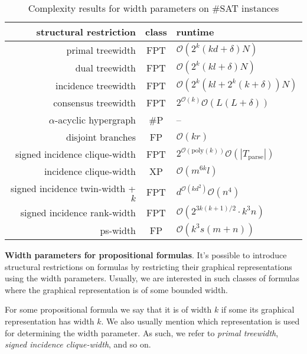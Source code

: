 \begin{table}
	\centering
	\begin{tabular}{r | c | l}
		\textbf{structural restriction} & \textbf{class} & \textbf{runtime} \\
		\hline
		primal treewidth \cite{DBLP:journals/jda/SamerS10} & FPT  & $\mathcal{O}(2^k(kd+\delta)N)$ \\
		dual treewidth \cite{DBLP:journals/jda/SamerS10} & FPT & $\mathcal{O}(2^k(kl+\delta)N)$ \\
		incidence treewidth \cite{DBLP:journals/jda/SamerS10} & FPT & $\mathcal{O}(2^k(kl+2^k(k+\delta))N)$ \\
		consensus treewidth \cite{DBLP:conf/sat/GanianS17} & FPT  & $2^{\mathcal{O}(k)}\mathcal{O}(L(L+\delta))$ \\
		\hline
		$\alpha$-acyclic hypergraph \cite{DBLP:conf/sat/CapelliDM14} & \#P  & -- \\
		disjoint branches \cite{DBLP:conf/sat/CapelliDM14} & FP & $\mathcal{O}(kr)$ \\
		\hline
		signed incidence clique-width \cite{DBLP:journals/dam/FischerMR08} & FPT & $2^{\mathcal{O}(\text{poly}(k))} \mathcal{O}(|T_{\text{parse}}|)$ \\
		incidence clique-width \cite{DBLP:conf/isaac/SlivovskyS13} & XP & $\mathcal{O}(m^{6k} l)$ \\
		\hline
		signed incidence twin-width + $k$ \cite{DBLP:conf/sat/GanianPSSS22} & FPT & $d^{\mathcal{O}(kd^2)}\mathcal{O}(n^4)$ \\
		signed incidence rank-width \cite{DBLP:journals/fuin/GanianHO13} & FPT & $\mathcal{O}(2^{3k(k+1)/2}\cdot k^3 n)$ \\
		ps-width \cite{DBLP:conf/sat/SaetherTV14} & FP & $\mathcal{O}(k^3s(m+n))$
	\end{tabular}
	\caption{Complexity results for width parameters on \#SAT instances}
	\label{table:complexity}
\end{table}

\noindent
\textbf{Width parameters for propositional formulas}.
It's possible to introduce structural restrictions on formulas by restricting their graphical representations using the width parameters.
Usually, we are interested in such classes of formulas where the graphical representation is of some bounded width.

For some propositional formula we say that it is of width $k$ if some its graphical representation has width $k$.
We also usually mention which representation is used for determining the width parameter. As such, we refer to {\em primal treewidth}, {\em signed incidence clique-width}, and so on.

